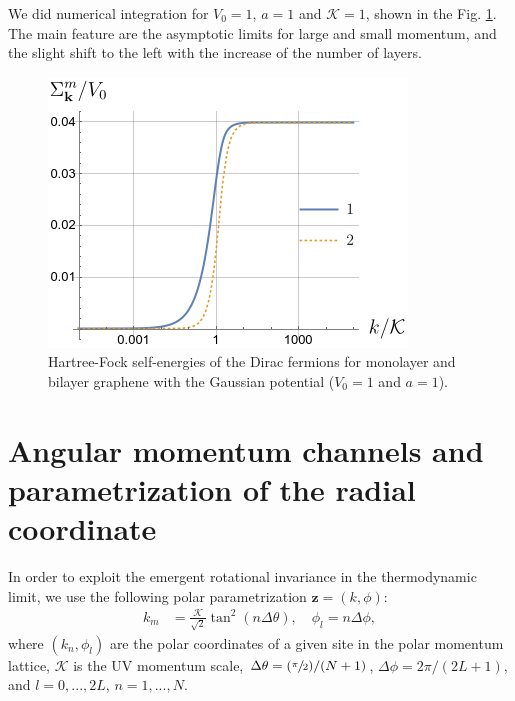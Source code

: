 \documentclass[english,aps,prd,nofootinbib,twocolumn]{revtex4-1}
\begin{document}
We did numerical integration for $V_{0}=1$, $a=1$ and $\mathcal{K}=1$, shown in the Fig.  \ref{fig:Multilayer-Self-Energies}. The main feature are the asymptotic limits for large and small momentum, and the slight shift to the left with the increase of the number of layers. 
\begin{figure}[h]
\centering
\includegraphics[scale=0.6]{GaussSelfEnergies.png}
\caption{Hartree-Fock self-energies of the Dirac fermions for monolayer and bilayer graphene with the Gaussian potential ($V_{0}=1$ and $a=1$). }
\label{fig:Multilayer-Self-Energies}
\end{figure}

\section{Angular momentum channels and parametrization of the radial coordinate}
In order to exploit the emergent rotational invariance in the thermodynamic limit, we use the following polar parametrization $\mathbf{z}=(k,\phi)$:
\begin{equation}
\label{eq:Tangential-radius}
\begin{split}
    k_{m} &= \frac{\mathcal{K}}{\sqrt{2}} \tan^{2}(n \Delta \theta), 
    \quad \phi_{l}=n\Delta \phi,
\end{split}
\end{equation}
where $(k_n,\phi_l)$ are the polar coordinates of a given site in the polar momentum lattice, $\mathcal{K}$ is the UV momentum scale, $\Delta \theta = (\sfrac{\pi}{2}) /(N+1)$, $\Delta \phi = 2\pi/(2L+1)$, and $l={0,...,2L}$, $n={1,...,N}$. 
\end{document}
